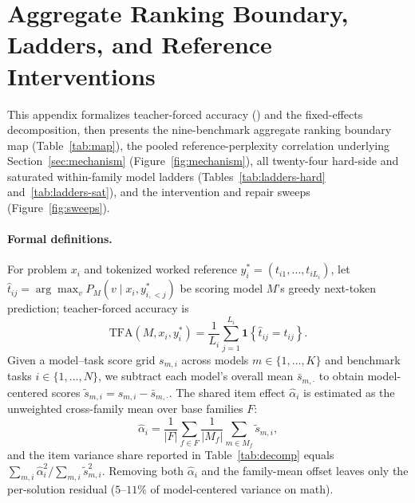 \section{Aggregate Ranking Boundary, Ladders, and Reference Interventions}
\label{app:boundary}

This appendix formalizes teacher-forced accuracy (\tfa) and the fixed-effects decomposition, then presents the nine-benchmark aggregate ranking boundary map (Table~\ref{tab:map}), the pooled reference-perplexity correlation underlying Section~\ref{sec:mechanism} (Figure~\ref{fig:mechanism}), all twenty-four hard-side and saturated within-family model ladders (Tables~\ref{tab:ladders-hard} and~\ref{tab:ladders-sat}), and the intervention and repair sweeps (Figure~\ref{fig:sweeps}).

\paragraph{Formal definitions.}
For problem $x_i$ and tokenized worked reference $y_i^* = (t_{i1}, \dots, t_{iL_i})$, let $\hat{t}_{ij} = \arg\max_v P_M(v \mid x_i, y_{i,<j}^*)$ be scoring model $M$'s greedy next-token prediction; teacher-forced accuracy is
\begin{equation}
\mathrm{TFA}(M, x_i, y_i^*) = \frac{1}{L_i} \sum_{j=1}^{L_i} \mathbf{1}\!\left\{\hat{t}_{ij} = t_{ij}\right\}.
\end{equation}
Given a model--task score grid $s_{m,i}$ across models $m \in \{1,\dots,K\}$ and benchmark tasks $i \in \{1,\dots,N\}$, we subtract each model's overall mean $\bar{s}_{m,\cdot}$ to obtain model-centered scores $\tilde{s}_{m,i} = s_{m,i} - \bar{s}_{m,\cdot}$.
The shared item effect $\hat{\alpha}_i$ is estimated as the unweighted cross-family mean over base families $F$:
\begin{equation}
\hat{\alpha}_i = \frac{1}{|F|}\sum_{f \in F} \frac{1}{|M_f|}\sum_{m \in M_f} \tilde{s}_{m,i},
\end{equation}
and the item variance share reported in Table~\ref{tab:decomp} equals $\sum_{m,i} \hat{\alpha}_i^2 / \sum_{m,i} \tilde{s}_{m,i}^2$.
Removing both $\hat{\alpha}_i$ and the family-mean offset leaves only the per-solution residual ($5$--$11\%$ of model-centered variance on math).

